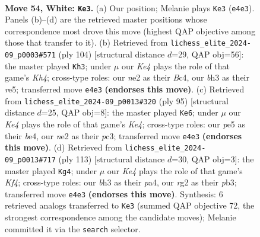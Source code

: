 \documentclass[11pt]{article}
\begin{document}
\clearpage

\begin{figure}[p]\centering
\begin{subfigure}{0.46\textwidth}\centering
\resizebox{\linewidth}{!}{%
\newchessgame
\chessboard[
  setfen={8/7p/3r1k2/4p3/1p2K1P1/7b/4n1r1/8 w - - 2 54},
  showmover=false,
  pgfstyle=straightmove, color=movearrow, markmove={e4-e3}
]}
\caption{}
\end{subfigure}\hfill
\begin{subfigure}{0.46\textwidth}\centering
\resizebox{\linewidth}{!}{%
\newchessgame
\chessboard[
  setfen={1k6/7R/1p1bP3/4r2p/2B4K/6p1/8/8 w - - 0 53},
  showmover=false,
  pgfstyle=straightmove, color=movearrow, markmove={h4-h3}
]}
\caption{}
\end{subfigure}
\\[4pt]
\begin{subfigure}{0.46\textwidth}\centering
\resizebox{\linewidth}{!}{%
\newchessgame
\chessboard[
  setfen={8/p5p1/8/4k3/4B3/2P1K3/P5R1/8 b - - 2 48},
  showmover=false,
  pgfstyle=straightmove, color=movearrow, markmove={e5-e6}
]}
\caption{}
\end{subfigure}\hfill
\begin{subfigure}{0.46\textwidth}\centering
\resizebox{\linewidth}{!}{%
\newchessgame
\chessboard[
  setfen={8/8/7p/p2R1k2/P7/1P1KB3/6r1/8 b - - 3 57},
  showmover=false,
  pgfstyle=straightmove, color=movearrow, markmove={f5-g4}
]}
\caption{}
\end{subfigure}
\caption{\textbf{Move 54, White: \texttt{Ke3}.} (a) Our position; Melanie plays \texttt{Ke3} (\texttt{e4e3}). Panels (b)--(d) are the retrieved master positions whose correspondence most drove this move (highest QAP objective among those that transfer to it). (b) Retrieved from \texttt{lichess\_elite\_2024-09\_p0003\#571} (ply 104) [structural distance $d$=29, QAP obj=56]: the master played \texttt{Kh3}; under $\mu$ our \emph{Ke4} plays the role of that game's \emph{Kh4}; cross-type roles: our \emph{n}e2 as their \emph{B}c4, our \emph{b}h3 as their \emph{r}e5; transferred move \texttt{e4e3} \textbf{(endorses this move)}. (c) Retrieved from \texttt{lichess\_elite\_2024-09\_p0013\#320} (ply 95) [structural distance $d$=25, QAP obj=8]: the master played \texttt{Ke6}; under $\mu$ our \emph{Ke4} plays the role of that game's \emph{Ke4}; cross-type roles: our \emph{p}e5 as their \emph{b}e4, our \emph{n}e2 as their \emph{p}c3; transferred move \texttt{e4e3} \textbf{(endorses this move)}. (d) Retrieved from \texttt{lichess\_elite\_2024-09\_p0013\#717} (ply 113) [structural distance $d$=30, QAP obj=3]: the master played \texttt{Kg4}; under $\mu$ our \emph{Ke4} plays the role of that game's \emph{Kf4}; cross-type roles: our \emph{b}h3 as their \emph{p}a4, our \emph{r}g2 as their \emph{p}b3; transferred move \texttt{e4e3} \textbf{(endorses this move)}. Synthesis: 6 retrieved analogs transferred to \texttt{Ke3} (summed QAP objective 72, the strongest correspondence among the candidate moves); Melanie committed it via the \texttt{search} selector.}
\label{fig:thought-m106}
\end{figure}
\end{document}
